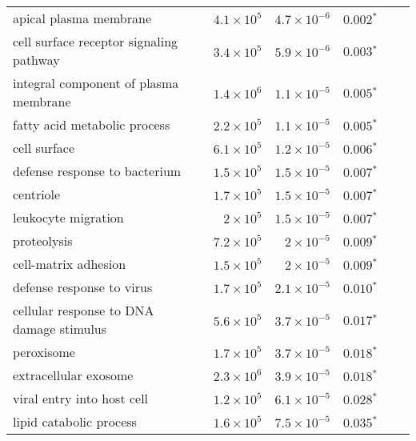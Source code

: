 \begin{longtable}{|l|r|r|r|r|r|}
                            apical plasma membrane & $4.1\times 10^{5}$ &  $4.7\times 10^{-6}$ &              $\bm{ 0.002{^*}}$ \\
           cell surface receptor signaling pathway & $3.4\times 10^{5}$ &  $5.9\times 10^{-6}$ &              $\bm{ 0.003{^*}}$ \\
             integral component of plasma membrane & $1.4\times 10^{6}$ &  $1.1\times 10^{-5}$ &              $\bm{ 0.005{^*}}$ \\
                      fatty acid metabolic process & $2.2\times 10^{5}$ &  $1.1\times 10^{-5}$ &              $\bm{ 0.005{^*}}$ \\
                                      cell surface & $6.1\times 10^{5}$ &  $1.2\times 10^{-5}$ &              $\bm{ 0.006{^*}}$ \\
                     defense response to bacterium & $1.5\times 10^{5}$ &  $1.5\times 10^{-5}$ &              $\bm{ 0.007{^*}}$ \\
                                         centriole & $1.7\times 10^{5}$ &  $1.5\times 10^{-5}$ &              $\bm{ 0.007{^*}}$ \\
                               leukocyte migration &  $ 2\times 10^{5}$ &  $1.5\times 10^{-5}$ &              $\bm{ 0.007{^*}}$ \\
                                       proteolysis & $7.2\times 10^{5}$ &   $ 2\times 10^{-5}$ &              $\bm{ 0.009{^*}}$ \\
                              cell-matrix adhesion & $1.5\times 10^{5}$ &   $ 2\times 10^{-5}$ &              $\bm{ 0.009{^*}}$ \\
                         defense response to virus & $1.7\times 10^{5}$ &  $2.1\times 10^{-5}$ &              $\bm{ 0.010{^*}}$ \\
          cellular response to DNA damage stimulus & $5.6\times 10^{5}$ &  $3.7\times 10^{-5}$ &              $\bm{ 0.017{^*}}$ \\
                                        peroxisome & $1.7\times 10^{5}$ &  $3.7\times 10^{-5}$ &              $\bm{ 0.018{^*}}$ \\
                             extracellular exosome & $2.3\times 10^{6}$ &  $3.9\times 10^{-5}$ &              $\bm{ 0.018{^*}}$ \\
                        viral entry into host cell & $1.2\times 10^{5}$ &  $6.1\times 10^{-5}$ &              $\bm{ 0.028{^*}}$ \\
                           lipid catabolic process & $1.6\times 10^{5}$ &  $7.5\times 10^{-5}$ &              $\bm{ 0.035{^*}}$ \\

\end{longtable}
